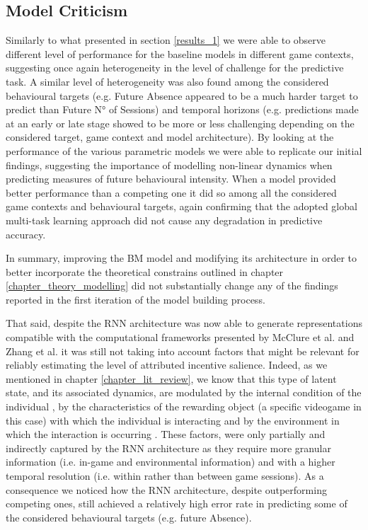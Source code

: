 \subsection{Model Criticism}
\label{model_criticims_2}
Similarly to what presented in section \ref{results_1} we were able to observe different level of performance for the baseline models in different game contexts, suggesting once again heterogeneity in the level of challenge for the predictive task. A similar level of heterogeneity was also found among the considered behavioural targets (e.g. Future Absence appeared to be a much harder target to predict than Future N° of Sessions) and temporal horizons (e.g. predictions made at an early or late stage showed to be more or less challenging depending on the considered target, game context and model architecture). By looking at the performance of the various parametric models we were able to replicate our initial findings, suggesting the importance of modelling non-linear dynamics when predicting measures of future behavioural intensity. When a model provided better performance than a competing one it did so among all the considered game contexts and behavioural targets, again confirming that the adopted global multi-task learning approach did not cause any degradation in predictive accuracy. 

In summary, improving the BM model and modifying its architecture in order to better incorporate the theoretical constrains outlined in chapter \ref{chapter_theory_modelling} did not substantially change any of the findings reported in the first iteration of the model building process. 

That said, despite the RNN architecture was now able to generate representations compatible with the computational frameworks presented by McClure et al. \cite{mcclure2003computational} and Zhang et al. \cite{zhang2009neural} it was still not taking into account factors that might be relevant for reliably estimating the level of attributed incentive salience. Indeed, as we mentioned in chapter \ref{chapter_lit_review}, we know that this type of latent state, and its associated dynamics, are modulated by the internal condition of the individual \cite{zhang2009neural}, by the characteristics of the rewarding object (a specific videogame in this case) with which the individual is interacting and by the environment in which the interaction is occurring \cite{palminteri2015contextual}. These factors, were only partially and indirectly captured by the RNN architecture as they require more granular information (i.e. in-game and environmental information) and with a higher temporal resolution (i.e. within rather than between game sessions). As a consequence we noticed how the RNN architecture, despite outperforming competing ones, still achieved a relatively high error rate in predicting some of the considered behavioural targets (e.g. future Absence). 

